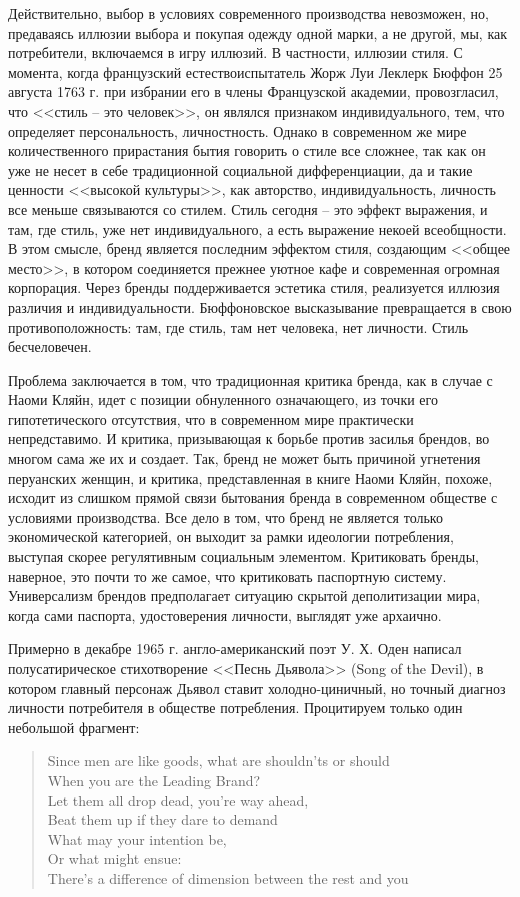 Действительно, выбор в условиях современного производства невозможен, но, предаваясь иллюзии выбора
и покупая одежду одной марки, а не другой, мы, как потребители, включаемся в игру иллюзий. В
частности, иллюзии стиля. С момента, когда французский естествоиспытатель Жорж Луи Леклерк Бюффон 25
августа 1763 г. при избрании его в члены Французской академии, провозгласил, что <<стиль -- это
человек>>, он являлся признаком индивидуального, тем, что определяет персональность,
личностность. Однако в современном же мире количественного прирастания бытия говорить о стиле все
сложнее, так как он уже не несет в себе традиционной социальной дифференциации, да и такие ценности
<<высокой культуры>>, как авторство, индивидуальность, личность все меньше связываются со
стилем. Стиль сегодня -- это эффект выражения, и там, где стиль, уже нет индивидуального, а есть
выражение некоей всеобщности. В этом смысле, бренд является последним эффектом стиля, создающим
<<общее место>>, в котором соединяется прежнее уютное кафе и современная огромная корпорация. Через
бренды поддерживается эстетика стиля, реализуется иллюзия различия и индивидуальности. Бюффоновское
высказывание превращается в свою противоположность: там, где стиль, там нет человека, нет
личности. Стиль бесчеловечен.

Проблема заключается в том, что традиционная критика бренда, как в случае с Наоми Кляйн, идет с
позиции обнуленного означающего, из точки его гипотетического отсутствия, что в современном мире
практически непредставимо. И критика, призывающая к борьбе против засилья брендов, во многом сама же
их и создает. Так, бренд не может быть причиной угнетения перуанских женщин, и критика,
представленная в книге Наоми Кляйн, похоже, исходит из слишком прямой связи бытования бренда в
современном обществе с условиями производства. Все дело в том, что бренд не является только
экономической категорией, он выходит за рамки идеологии потребления, выступая скорее регулятивным
социальным элементом. Критиковать бренды, наверное, это почти то же самое, что критиковать
паспортную систему. Универсализм брендов предполагает ситуацию скрытой деполитизации мира, когда
сами паспорта, удостоверения личности, выглядят уже архаично.

Примерно в декабре 1965 г. англо-американский поэт У. Х. Оден написал полусатирическое
стихотворение <<Песнь Дьявола>> (Song of the Devil), в котором главный персонаж Дьявол ставит
холодно-циничный, но точный диагноз личности потребителя в обществе потребления. Процитируем только
один небольшой фрагмент:
\begin{verse}
Since men are like goods, what are shouldn'ts or should \\
When you are the Leading Brand? \\
Let them all drop dead, you're way ahead, \\
Beat them up if they dare to demand \\
What may your intention be, \\
Or what might ensue: \\
There's a difference of dimension between the rest and you
\end{verse}

